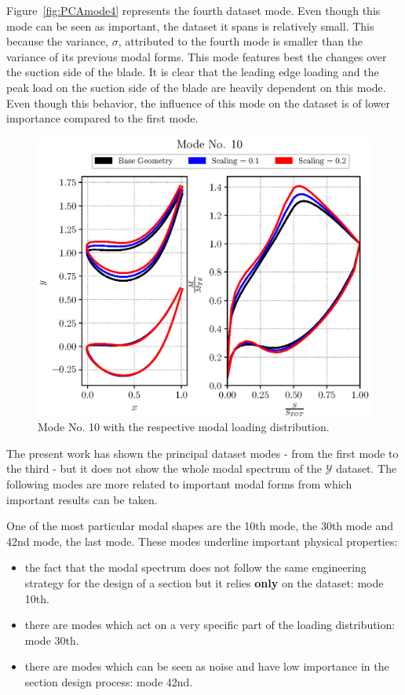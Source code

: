 Figure~\ref{fig:PCAmode4} represents the fourth dataset mode. Even though this mode can be seen as important, 
the dataset it spans is relatively small. This because the variance, $\sigma$, attributed to the fourth mode is smaller than the variance of its previous modal forms.
This mode features best the changes over the suction side of the blade. It is clear that the leading edge loading and the peak load on the suction side of the blade 
are heavily dependent on this mode. Even though this behavior, the influence of this mode on the dataset is of lower importance compared to the first mode.

\begin{figure}[H]
    \centering
    \includegraphics[scale=\scaleBlade]{./images/mode10.eps}
    \caption{Mode No. 10 with the respective modal loading distribution.}
    \label{fig:PCAmode10}
\end{figure}

The present work has shown the principal dataset modes - from the first mode to the third - but it
does not show the whole modal spectrum of the $\mathcal{Y}$ dataset. The following modes 
are more related to important modal forms from which important results can be taken. 

One of the most particular modal shapes are the 10th mode, the 30th mode and 42nd mode, the last mode.
These modes underline important physical properties:

\begin{itemize}
    \item the fact that the modal spectrum does not follow the same engineering strategy for the design of a section 
    but it relies \textbf{only} on the dataset: mode 10th.
    \item there are modes which act on a very specific part of the loading distribution: mode 30th.
    \item there are modes which can be seen as noise and have low importance in the section design process: mode 42nd.
\end{itemize}

